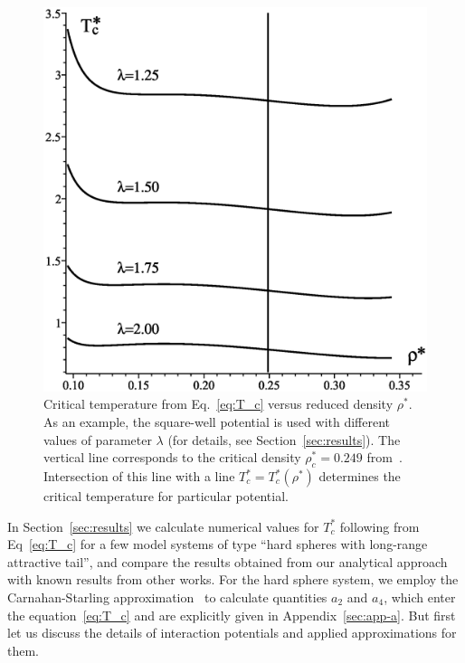 \begin{figure}[htbp]
	\includegraphics[width=\column]{critical_temp_vs_rho}
	\caption{Critical temperature from Eq.~\eqref{eq:T_c} versus reduced density $\rho^*$. As an example, the square-well potential is used with different values of parameter $\lambda$ (for details, see Section~\ref{sec:results}). The vertical line corresponds to the critical density $\rho^*_c=0.249$ from~\cite{YukhJSP1995}. Intersection of this line with a line $T_c^* = T_c^*(\rho^*)$ determines the critical temperature for particular potential.}
	\label{fig:t_c_vs_rho}
\end{figure}

In Section~\ref{sec:results} we calculate numerical values for $T^*_c$ following from Eq~\eqref{eq:T_c} for a few model systems of type ``hard spheres with long-range attractive tail'', and compare the results obtained from our analytical approach with known results from other works. For the hard sphere system, we employ the Carnahan-Starling approximation~\cite{CarnahanStarling1969} to calculate quantities $a_2$ and $a_4$, which enter the equation~\eqref{eq:T_c} and are explicitly given in Appendix~\ref{sec:app-a}. But first let us discuss the details of interaction potentials and applied approximations for them.
